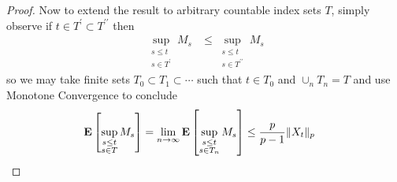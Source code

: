 \begin{proof}
Now to extend the result to arbitrary countable index sets $T$, simply
observe if $t \in T^\prime \subset T^{\prime \prime}$ then 
\begin{align*}
\sup_{\substack{s \leq t \\ s \in T^\prime }} M_s &\leq
\sup_{\substack{s \leq t \\ s \in T^{\prime \prime}}} M_s
\end{align*}
so we may take finite sets $T_0 \subset T_1 \subset \cdots$ such that
$t \in T_0$ and $\cup_n T_n = T$ and use Monotone Convergence to
conclude 
\begin{align*}
\textbf{E}\left[\sup_{\substack{s \leq t \\ s \in T }} M_s\right] &= 
\lim_{n \to    \infty} \textbf{E}\left[\sup_{\substack{s \leq t \\ s \in T_n }} M_s\right] \leq 
\frac{p}{p-1}\lVert X_t \rVert_p
\end{align*}
\end{proof}

